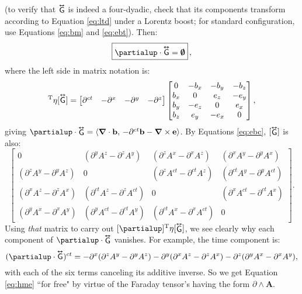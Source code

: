 \documentclass[12pt]{article}
\renewcommand{\vv}[1]{\mathbf{#1}}
\newcommand{\del}{\boldsymbol{\nabla}}
\newcommand{\tightoverset}[2]{%
  \mathop{#2}\limits^{\vbox to -.5ex{\kern-0.75ex\hbox{$#1$}\vss}}}
\newcommand{\inlinedy}[1]{\tightoverset{\text{\tiny$\bm\leftrightarrow$}}{#1}}
\newcommand{\capdy}[1]{ \overset{ \text{\tiny$\bm\leftrightarrow$} }{\vphantom{\text{\small{A}}}\smash{#1}} }
\begin{document}
(to verify that $\inlinedy{\mathsf{G}}$ is indeed a four-dyadic, check that its components transform according to Equation \ref{eq:ltd} under a Lorentz boost; for standard configuration, use Equations \ref{eq:bm} and \ref{eq:ebt}). Then:
\begin{equation}\label{eq:hme}
\boxed{ \vphantom{A_{A_A}} \partialup \cdot \capdy{\mathsf{G}} = \textrm{\mbox{\boldmath $\emptyset$}} } \, ,
\end{equation}
where the left side in matrix notation is:
\begin{equation*}
[\partialup]^{\mathrm{T}} \eta [\capdy{\mathsf{G}}]
=
\begin{bmatrix}
\partial^{ct} & - \partial^x & - \partial^y & - \partial^z
\end{bmatrix}
\begin{bmatrix}
0 & -b_x & -b_y & -b_z \\
b_x & 0 & e_z & -e_y \\
b_y & -e_z & 0 & e_x \\
b_z & e_y & -e_x & 0
\end{bmatrix} ,
\end{equation*}
giving $\partialup \cdot \inlinedy{\mathsf{G}} = \langle \del \cdot \vv b , \, - \partial^{ct} \vv b - \del \times \vv e \rangle$. By Equations \ref{eq:ebc}, $[\inlinedy{\mathsf{G}}]$ is also:
\begin{equation*}
\begin{bmatrix}
0 & ( \partial^y A^z - \partial^z A^y ) & ( \partial^z A^x - \partial^x A^z ) & ( \partial^x A^y - \partial^y A^x ) \\[1.5ex]
( \partial^z A^y - \partial^y A^z ) & 0 & ( \partial^z A^{ct} - \partial^{ct} A^z ) & ( \partial^{ct} A^y - \partial^y A^{ct} ) \\[1.5ex]
( \partial^x A^z - \partial^z A^x ) & ( \partial^{ct} A^z - \partial^z A^{ct} ) & 0 & ( \partial^x A^{ct} - \partial^{ct} A^x ) \\[1.5ex]
( \partial^y A^x - \partial^x A^y ) & ( \partial^y A^{ct} - \partial^{ct} A^y ) & ( \partial^{ct} A^x - \partial^x A^{ct} ) & 0
\end{bmatrix} .
\end{equation*}
Using \emph{that} matrix to carry out $[\partialup]^{\mathrm{T}} \eta [\inlinedy{\mathsf{G}}]$, we see clearly why each component of $\partialup \cdot \inlinedy{\mathsf{G}}$ vanishes. For example, the time component is:
\begin{equation*}
(\partialup \cdot \capdy{\mathsf{G}})^{ct} = - \partial^x ( \partial^z A^y - \partial^y A^z ) - \partial^y ( \partial^x A^z - \partial^z A^x ) - \partial^z ( \partial^y A^x - \partial^x A^y ) ,
\end{equation*}
with each of the six terms canceling its additive inverse. So we get Equation \ref{eq:hme} ``for free" by virtue of the Faraday tensor's having the form $\partialup \wedge \vv A$.
\end{document}
